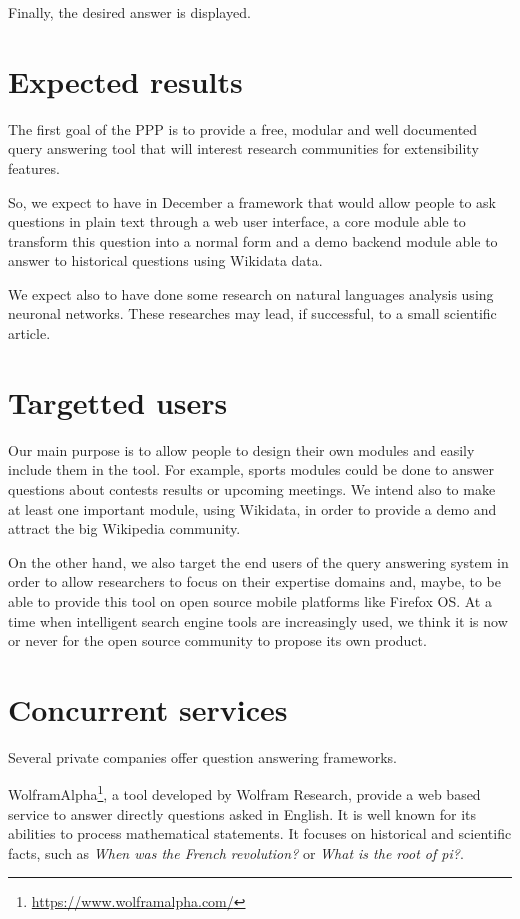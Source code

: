 \documentclass[a4paper,10pt]{article}
\begin{document}
Finally, the desired answer is displayed.

\section{Expected results}
The first goal of the PPP is to provide a free, modular and well documented
query answering tool that will interest research communities for extensibility features. 

So, we expect to have in December a framework that would allow people to ask
questions in plain text through a web user interface, a core module able to transform
this question into a normal form and a demo backend module able to answer
to historical questions using Wikidata data.

We expect also to have done some research on natural languages analysis using
neuronal networks. These researches may lead, if successful, to
a small scientific article.

\section{Targetted users}

Our main purpose is to allow people to design their own modules and
easily include them in the tool. For example, sports modules could be done to answer questions about contests results or 
upcoming meetings.  We intend also to make at least one important module, using Wikidata, in order to provide a demo
and attract the big Wikipedia community. 

On the other hand, we also target the end users of the query answering system in order to allow researchers to focus on
their expertise domains and, maybe, to be able to provide this tool on open source mobile platforms like Firefox OS. At a
time when intelligent search engine tools are increasingly used, we think it is now or never for the open source community
to propose its own product.

\section{Concurrent services}

Several private companies offer question answering frameworks. 

WolframAlpha\footnote{\url{https://www.wolframalpha.com/}}, a tool developed by 
Wolfram Research, provide a web based service to answer directly questions asked
in English. It is well known for its abilities to process mathematical statements.
It focuses on historical and scientific facts, such as \emph{When was the French 
revolution?} or \emph{What is the root of pi?}.
\end{document}
